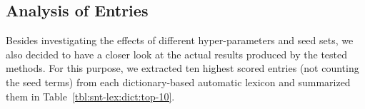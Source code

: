 
\subsection{Analysis of Entries}\label{subsec:snt-lex:aoe}

Besides investigating the effects of different hyper-parameters and
seed sets, we also decided to have a closer look at the actual results
produced by the tested methods.  For this purpose, we extracted ten
highest scored entries (not counting the seed terms) from each
dictionary-based automatic lexicon and summarized them in
Table~\ref{tbl:snt-lex:dict:top-10}.

